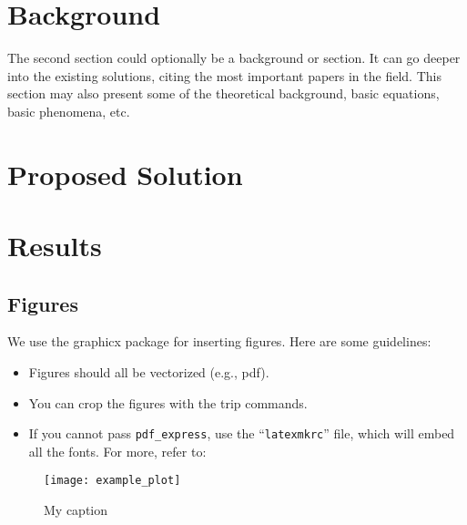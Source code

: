 \documentclass[conference]{IEEEtran}
\begin{document}


\section{Background}
\label{sec_background}
The second section could optionally be a background or \sota section. 
It can go deeper into the existing solutions, citing the most important papers in the field.
This section may also present some of the theoretical background, basic equations, basic phenomena, etc.

\section{Proposed Solution}
\label{sec_proposed_solution}

\lipsum[1-2]

\section{Results}
\label{sec_results}

\subsection{Figures}
We use the graphicx package for inserting figures. Here are some guidelines:
\begin{itemize}
    \item Figures should all be vectorized (e.g., pdf).
    \item You can crop the figures with the trip commands.
    \item If you cannot pass \texttt{pdf\_express}, use the ``\texttt{latexmkrc}'' file, which will embed all the fonts.
    For more, refer to: \href{https://www.overleaf.com/learn/latex/Articles/How_to_use_latexmkrc_with_Overleaf}{}
\end{itemize}

\begin{figure}[t] %
     \centering
     \texttt{[image: example\_plot]}
     \caption{My caption}
     \label{fig:MyLabel}
  \end{figure}
\end{document}
